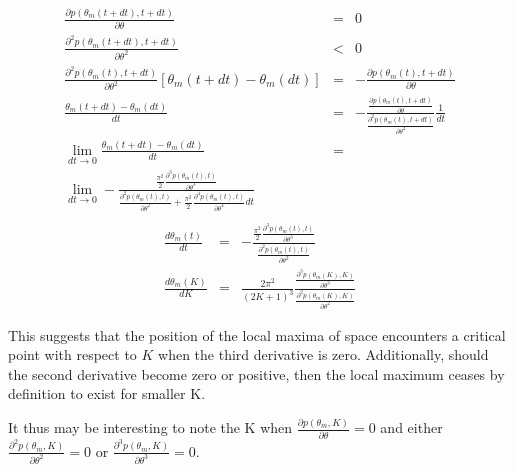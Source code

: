 \documentclass{article}
\begin{document}
\begin{eqnarray}
	\frac{\partial p(\theta_m(t+dt),t+dt)}{\partial \theta} & = & 0 \\
	\frac{\partial^2 p(\theta_m(t+dt),t+dt)}{\partial \theta^2} & < & 0  \\
	\frac{\partial^2 p(\theta_m(t),t+dt)}{\partial \theta^2} \left[ \theta_m(t+dt) - \theta_m(dt) \right] & = & - \frac{\partial p(\theta_m(t),t+dt)}{\partial \theta} \\
	\frac{ \theta_m(t+dt) - \theta_m(dt) }{dt} & = & - \frac{ \frac{\partial p(\theta_m(t),t+dt)}{\partial \theta}  }{ \frac{\partial^2 p(\theta_m(t),t+dt)}{\partial \theta^2}  } \frac{1}{dt} \\
	\lim_{dt \to 0 } \frac{ \theta_m(t+dt) - \theta_m(dt) }{dt} & = & \nonumber \\
	\lim_{dt \to 0 } - \frac{ \displaystyle \frac{\pi^2}{2} \frac{\partial^3 p(\theta_m(t),t)}{\partial \theta^3}  }{ \displaystyle \frac{\partial^2 p(\theta_m(t),t)}{\partial \theta^2} \nonumber
	                                                                       + \frac{\pi^2}{2} \frac{\partial^4 p(\theta_m(t),t)}{\partial \theta^4} dt  } \\
\end{eqnarray}
\begin{eqnarray}
									       \frac{d \theta_m(t)}{dt} & = & 
									       - \frac{ \displaystyle \frac{\pi^2}{2} \frac{\partial^3 p(\theta_m(t),t)}{\partial \theta^3}  }{ \displaystyle \frac{\partial^2 p(\theta_m(t),t)}{\partial \theta^2} }  \\
									       \frac{d \theta_m(K)}{dK} & = & 
									       \frac{2 \pi^2}{(2K+1)^3}
									       \frac{ \displaystyle \frac{\partial^3 p(\theta_m(K),K)}{\partial \theta^3}  }{ \displaystyle \frac{\partial^2 p(\theta_m(K),K)}{\partial \theta^2} } 
\end{eqnarray}

This suggests that the position of the local maxima of space encounters a critical point with respect to $ K $ when the third derivative is zero. Additionally, should the second derivative become zero or positive, then the local maximum ceases by definition to exist for smaller K.

It thus may be interesting to note the K when $ \frac{\partial p(\theta_m,K)}{\partial \theta} = 0 $ and either $ \frac{\partial^2 p(\theta_m,K)}{\partial \theta^2} = 0 $ or $ \frac{\partial^3 p(\theta_m,K)}{\partial \theta^3} = 0 $.
\end{document}
